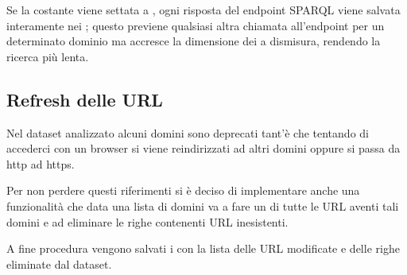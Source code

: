 Se la costante  viene settata a , ogni risposta del endpoint SPARQL viene salvata interamente nei ;
questo previene qualsiasi altra chiamata all'endpoint per un determinato dominio ma accresce la dimensione dei  a dismisura, rendendo la ricerca più lenta.
 
\subsection{Refresh delle URL}
Nel dataset analizzato alcuni domini sono deprecati tant'è che tentando di accederci con un browser si viene reindirizzati ad altri domini oppure si passa da http ad https.

Per non perdere questi riferimenti si è deciso di implementare anche una funzionalità che data una lista di domini va a fare un  di tutte le URL aventi tali domini 
e ad eliminare le righe contenenti URL inesistenti.

A fine procedura vengono salvati i  con la lista delle URL modificate e delle righe eliminate dal dataset.

